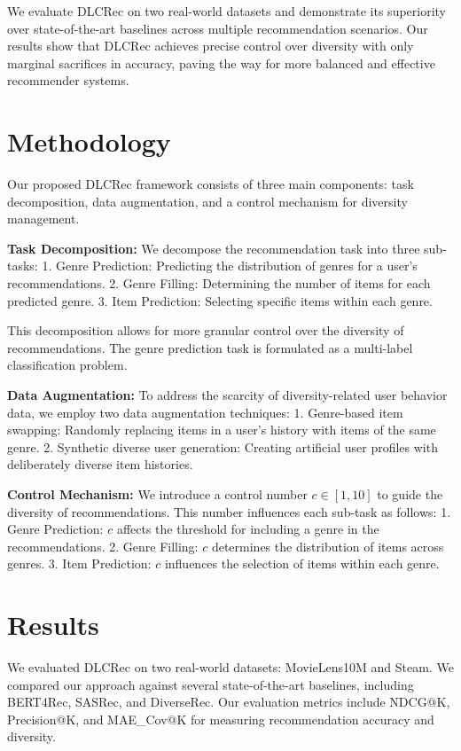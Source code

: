 \documentclass[12pt,letterpaper]{article}
\begin{document}
We evaluate DLCRec on two real-world datasets and demonstrate its superiority over state-of-the-art baselines across multiple recommendation scenarios. Our results show that DLCRec achieves precise control over diversity with only marginal sacrifices in accuracy, paving the way for more balanced and effective recommender systems.

\section{Methodology}

Our proposed DLCRec framework consists of three main components: task decomposition, data augmentation, and a control mechanism for diversity management.

\textbf{Task Decomposition:}
We decompose the recommendation task into three sub-tasks:
1. Genre Prediction: Predicting the distribution of genres for a user's recommendations.
2. Genre Filling: Determining the number of items for each predicted genre.
3. Item Prediction: Selecting specific items within each genre.

This decomposition allows for more granular control over the diversity of recommendations. The genre prediction task is formulated as a multi-label classification problem.

\textbf{Data Augmentation:}
To address the scarcity of diversity-related user behavior data, we employ two data augmentation techniques:
1. Genre-based item swapping: Randomly replacing items in a user's history with items of the same genre.
2. Synthetic diverse user generation: Creating artificial user profiles with deliberately diverse item histories.

\textbf{Control Mechanism:}
We introduce a control number $c \in [1, 10]$ to guide the diversity of recommendations. This number influences each sub-task as follows:
1. Genre Prediction: $c$ affects the threshold for including a genre in the recommendations.
2. Genre Filling: $c$ determines the distribution of items across genres.
3. Item Prediction: $c$ influences the selection of items within each genre.

\section{Results}

We evaluated DLCRec on two real-world datasets: MovieLens10M and Steam. We compared our approach against several state-of-the-art baselines, including BERT4Rec, SASRec, and DiverseRec. Our evaluation metrics include NDCG@K, Precision@K, and MAE_Cov@K for measuring recommendation accuracy and diversity.
\end{document}
